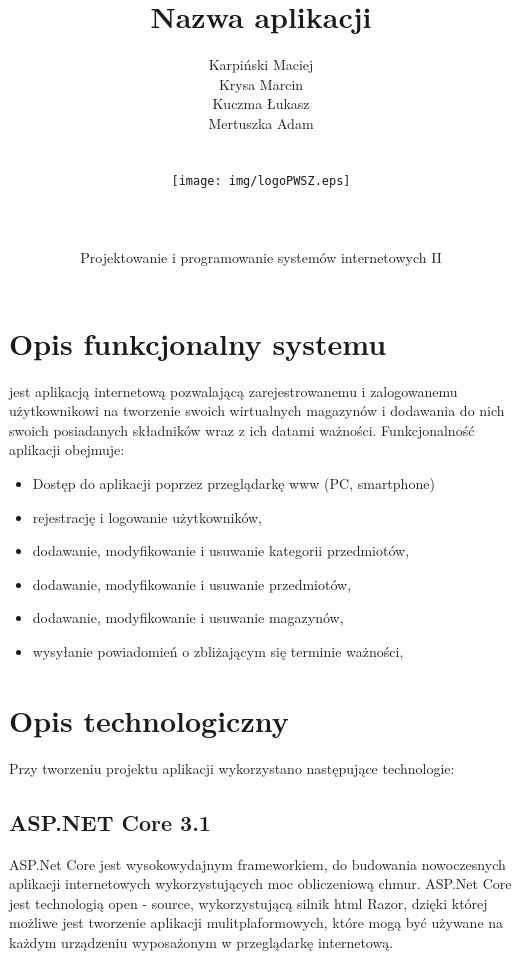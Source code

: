 \documentclass[12pt,a4paper]{article}
\author{Karpiński Maciej\\Krysa Marcin\\Kuczma Łukasz\\Mertuszka Adam\\\\\\\texttt{[image: img/logoPWSZ.eps]}\\\\\\\\Projektowanie i programowanie systemów internetowych II}
\title{Nazwa aplikacji}
\begin{document}
	\maketitle
	\thispagestyle{empty}
	\clearpage

	\tableofcontents
	\newpage

	\section{Opis funkcjonalny systemu}
		\indent jest aplikacją internetową pozwalającą zarejestrowanemu i zalogowanemu użytkownikowi na tworzenie swoich wirtualnych magazynów i dodawania
		do nich swoich posiadanych składników wraz z ich datami ważności. Funkcjonalność aplikacji obejmuje:
		\begin{itemize}
			\item Dostęp do aplikacji poprzez przeglądarkę www (PC, smartphone)
			\item rejestrację i logowanie użytkowników,
			\item dodawanie, modyfikowanie i usuwanie kategorii przedmiotów,
			\item dodawanie, modyfikowanie i usuwanie przedmiotów,
			\item dodawanie, modyfikowanie i usuwanie magazynów,
			\item wysyłanie powiadomień o zbliżającym się terminie ważności,
		\end{itemize}
	\newpage

	\section{Opis technologiczny}
		\indent Przy tworzeniu projektu aplikacji wykorzystano następujące technologie:

		\subsection{ASP.NET Core 3.1}
			\indent ASP.Net Core jest wysokowydajnym frameworkiem, do budowania nowoczesnych aplikacji internetowych wykorzystujących moc obliczeniową chmur. ASP.Net Core jest technologią
			open - source, wykorzystującą silnik html Razor, dzięki której możliwe jest tworzenie aplikacji mulitplaformowych, które mogą być używane na każdym urządzeniu wyposażonym
			w przeglądarkę internetową.
\end{document}
